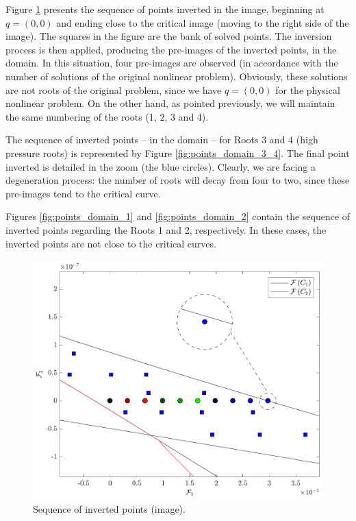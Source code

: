 \documentclass{article}
\theoremstyle{definition}
\theoremstyle{remark}
\begin{document}
Figure \ref{fig:points_image} presents the sequence of points inverted in the image, beginning at $q = \left(0,0\right)$ and ending close to the critical image (moving to the right side of the image). The squares in the figure are the bank of solved points. The inversion process is then applied, producing the pre-images of the inverted points, in the domain. In this situation, four pre-images are observed (in accordance with the number of solutions of the original nonlinear problem). Obviously, these solutions are not roots of the original problem, since we have $q = (0,0)$ for the physical nonlinear problem. On the other hand, as pointed previously, we will maintain the same numbering of the roots (1, 2, 3 and 4).

The sequence of inverted points -- in the domain -- for Roots 3 and 4 (high pressure roots) is represented by Figure \ref{fig:points_domain_3_4}. The final point inverted is detailed in the zoom (the blue circles). Clearly, we are facing a degeneration process: the number of roots will decay from four to two, since these pre-images tend to the critical curve.

Figures \ref{fig:points_domain_1} and \ref{fig:points_domain_2} contain the sequence of inverted points regarding the Roots 1 and 2, respectively. In these cases, the inverted points are not close to the critical curves.

\begin{figure}
	\begin{center}
		\includegraphics[scale=0.50]{sequencia_pontos_imagem.pdf}
		\caption{Sequence of inverted points (image).}\label{fig:points_image}
	\end{center}
\end{figure}
\end{document}
